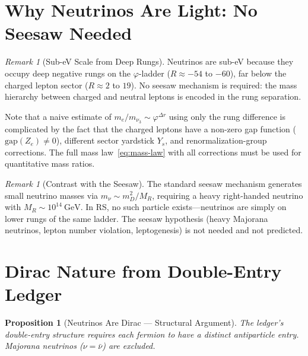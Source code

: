 \documentclass[12pt,a4paper]{article}
\newtheorem{proposition}[theorem]{Proposition}
\theoremstyle{definition}
\theoremstyle{remark}
\newtheorem{remark}[theorem]{Remark}
\begin{document}
\section{Why Neutrinos Are Light: No Seesaw Needed}
\label{sec:light}

\begin{remark}[Sub-eV Scale from Deep Rungs]
\label{rem:sub-ev}
Neutrinos are sub-eV because they occupy deep negative rungs
on the $\varphi$-ladder ($R \approx -54$ to $-60$), far below
the charged lepton sector ($R \approx 2$ to $19$).  No seesaw
mechanism is required: the mass hierarchy between charged and
neutral leptons is encoded in the rung separation.

Note that a naive estimate of $m_e/m_{\nu_3} \sim
\varphi^{\Delta r}$ using only the rung difference is
complicated by the fact that the charged leptons have a
non-zero gap function ($\mathrm{gap}(Z_e) \neq 0$), different
sector yardstick $Y_s$, and renormalization-group corrections.
The full mass law~\eqref{eq:mass-law} with all corrections must
be used for quantitative mass ratios.
\end{remark}

\begin{remark}[Contrast with the Seesaw]
The standard seesaw mechanism generates small neutrino masses
via $m_\nu \sim m_D^2/M_R$, requiring a heavy right-handed
neutrino with $M_R \sim 10^{14}~\mathrm{GeV}$.  In RS, no
such particle exists---neutrinos are simply on lower rungs of
the same ladder.  The seesaw hypothesis (heavy Majorana
neutrinos, lepton number violation, leptogenesis) is not needed
and not predicted.
\end{remark}

\section{Dirac Nature from Double-Entry Ledger}
\label{sec:dirac}

\begin{proposition}[Neutrinos Are Dirac --- Structural Argument]
\label{thm:dirac}
The ledger's double-entry structure requires each fermion to
have a distinct antiparticle entry.  Majorana neutrinos
($\nu = \bar{\nu}$) are excluded.
\end{proposition}
\end{document}
